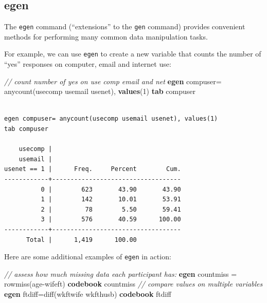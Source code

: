 \documentclass[]{book}
\newenvironment{Shaded}{\begin{snugshade}}{\end{snugshade}}
\newcommand{\CommentTok}[1]{\textcolor[rgb]{0.56,0.35,0.01}{\textit{#1}}}
\newcommand{\FunctionTok}[1]{\textcolor[rgb]{0.00,0.00,0.00}{#1}}
\newcommand{\KeywordTok}[1]{\textcolor[rgb]{0.13,0.29,0.53}{\textbf{#1}}}
\newcommand{\NormalTok}[1]{#1}
\begin{document}
\hypertarget{egen}{%
\subsection{egen}\label{egen}}

The \texttt{egen} command (``extensions'' to the \texttt{gen} command) provides convenient methods for performing many common data manipulation tasks.

For example, we can use \texttt{egen} to create a new variable that counts the number of ``yes'' responses on computer, email and internet use:

\begin{Shaded}
\begin{Highlighting}[]
  \CommentTok{// count number of yes on use comp email and net }
  \KeywordTok{egen}\NormalTok{ compuser= }\FunctionTok{anycount}\NormalTok{(usecomp usemail usenet), }\KeywordTok{values}\NormalTok{(1)}
  \KeywordTok{tab}\NormalTok{ compuser}
\end{Highlighting}
\end{Shaded}

\begin{verbatim}

egen compuser= anycount(usecomp usemail usenet), values(1)
tab compuser

    usecomp |
    usemail |
usenet == 1 |      Freq.     Percent        Cum.
------------+-----------------------------------
          0 |        623       43.90       43.90
          1 |        142       10.01       53.91
          2 |         78        5.50       59.41
          3 |        576       40.59      100.00
------------+-----------------------------------
      Total |      1,419      100.00
\end{verbatim}

Here are some additional examples of \texttt{egen} in action:

\begin{Shaded}
\begin{Highlighting}[]
  \CommentTok{// assess how much missing data each participant has:}
  \KeywordTok{egen}\NormalTok{ countmiss = }\FunctionTok{rowmiss}\NormalTok{(age-wifeft)}
  \KeywordTok{codebook}\NormalTok{ countmiss}
  \CommentTok{// compare values on multiple variables}
  \KeywordTok{egen}\NormalTok{ ftdiff=}\FunctionTok{diff}\NormalTok{(wkftwife wkfthusb)}
  \KeywordTok{codebook}\NormalTok{ ftdiff}
\end{Highlighting}
\end{Shaded}
\end{document}
